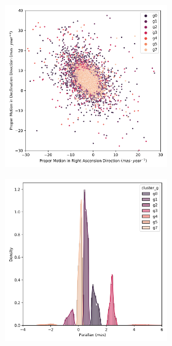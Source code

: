 \documentclass[11pt,a4paper,english,twocolumn]{article}
\begin{document}
\begin{figure}[htbp]
\begin{subfigure}{\columnwidth}
\begin{subfigure}[t]{0.30\textwidth}
    \end{subfigure}
  \end{subfigure}
  \centering
  \begin{subfigure}{\columnwidth}
    \centering
    \begin{subfigure}[t]{0.30\textwidth}
      \centering
      \includegraphics[width=\textwidth]{../figures/ngc_2516/dec_pm_filtered_ngc_2516.png}
    \end{subfigure}
    \hfill
    \begin{subfigure}[t]{0.30\textwidth}
      \centering
      \includegraphics[width=\textwidth]{../figures/ngc_2516/dec_parallax_filtered_ngc_2516.png}

\end{subfigure}
\end{subfigure}
\end{figure}
\end{document}

